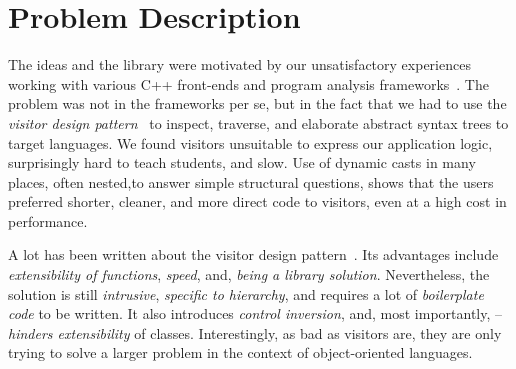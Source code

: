 \section{Problem Description} %
\label{sec:probl}

The ideas and the library were motivated by our unsatisfactory experiences 
working with various C++ front-ends and program analysis 
frameworks~\cite{Pivot09,Phoenix,Clang}.
The problem was not in the frameworks per se, but in the fact that we had to use
the \emph{visitor design pattern}~\cite{DesignPatterns1993} to inspect, traverse, and 
elaborate abstract syntax trees to target languages. We found visitors 
unsuitable to express our application logic, surprisingly hard to teach 
students, and slow. Use of dynamic casts in many places, often nested,to 
answer simple structural questions, shows that the users 
preferred shorter, cleaner, and more direct code to visitors, even at a high 
cost in performance.

A lot has been written about the visitor design pattern~\cite{DesignPatterns1993,Zenger:2001,Oliveira08}. 
Its advantages include \emph{extensibility of functions}, \emph{speed}, and, \emph{being a library solution}. Nevertheless, the solution 
is still \emph{intrusive}, \emph{specific to hierarchy}, and requires a lot of 
\emph{boilerplate code} to be written. It also introduces \emph{control 
inversion}, and, most importantly, -- \emph{hinders extensibility} of classes.
Interestingly, as bad as visitors are, they are only trying to solve a larger 
problem in the context of object-oriented languages.



